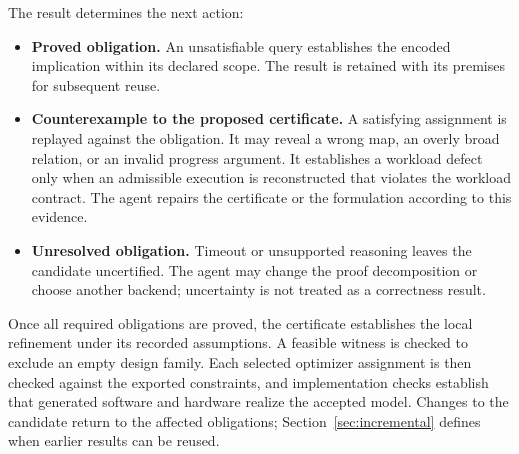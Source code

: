 \documentclass[11pt]{article}
\begin{document}
The result determines the next action:
\begin{itemize}
\item \textbf{Proved obligation.} An unsatisfiable query establishes the encoded implication within its declared scope. The result is retained with its premises for subsequent reuse.
\item \textbf{Counterexample to the proposed certificate.} A satisfying assignment is replayed against the obligation. It may reveal a wrong map, an overly broad relation, or an invalid progress argument. It establishes a workload defect only when an admissible execution is reconstructed that violates the workload contract. The agent repairs the certificate or the formulation according to this evidence.
\item \textbf{Unresolved obligation.} Timeout or unsupported reasoning leaves the candidate uncertified. The agent may change the proof decomposition or choose another backend; uncertainty is not treated as a correctness result.
\end{itemize}

Once all required obligations are proved, the certificate establishes the local refinement under its recorded assumptions. A feasible witness is checked to exclude an empty design family. Each selected optimizer assignment is then checked against the exported constraints, and implementation checks establish that generated software and hardware realize the accepted model. Changes to the candidate return to the affected obligations; Section~\ref{sec:incremental} defines when earlier results can be reused.
\end{document}
